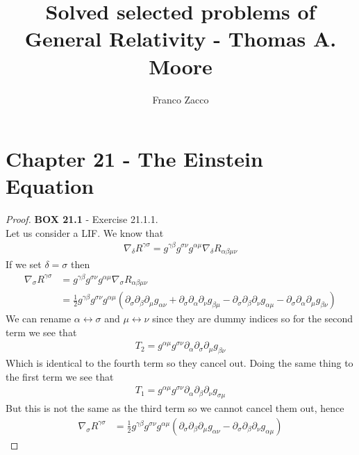 \documentclass[11pt]{article}
\title{\textbf{Solved selected problems of General Relativity - Thomas A. Moore}}
\author{Franco Zacco}
\date{}
\theoremstyle{definition}
\begin{document}
\maketitle
\thispagestyle{empty}

\section*{Chapter 21 - The Einstein Equation}

\begin{proof}{\textbf{BOX 21.1} - Exercise 21.1.1.}\\
Let us consider a LIF. We know that
\begin{align*}
    \nabla_{\delta} R^{\gamma\sigma}
    = g^{\gamma\beta} g^{\sigma\nu} g^{\alpha\mu}
    \nabla_{\delta} R_{\alpha\beta\mu\nu}
\end{align*}
If we set $\delta = \sigma$ then
\begin{align*}
    \nabla_{\sigma} R^{\gamma\sigma}
    &= g^{\gamma\beta} g^{\sigma\nu} g^{\alpha\mu}
    \nabla_{\sigma} R_{\alpha\beta\mu\nu}\\
    &= \frac{1}{2}g^{\gamma\beta} g^{\sigma\nu} g^{\alpha\mu}(
        \partial_{\sigma}\partial_\beta\partial_\mu g_{\alpha\nu}
        + \partial_{\sigma}\partial_\alpha\partial_\nu g_{\beta\mu}
        - \partial_{\sigma}\partial_\beta\partial_\nu g_{\alpha\mu}
        - \partial_{\sigma}\partial_\alpha\partial_\mu g_{\beta\nu}
    )
\end{align*}
We can rename $\alpha \leftrightarrow\sigma$ and $\mu\leftrightarrow\nu$ since
they are dummy indices so for the second term we see that
\begin{align*}
    T_2 = g^{\alpha\mu} g^{\sigma\nu}
    \partial_{\alpha}\partial_\sigma\partial_\mu g_{\beta\nu}
\end{align*}
Which is identical to the fourth term so they cancel out.
Doing the same thing to the first term we see that
\begin{align*}
    T_1 = g^{\alpha\mu} g^{\sigma\nu}
    \partial_{\alpha}\partial_\beta\partial_\nu g_{\sigma\mu}
\end{align*}
But this is not the same as the third term so we cannot cancel them out, hence
\begin{align*}
    \nabla_{\sigma} R^{\gamma\sigma}
    &= \frac{1}{2}g^{\gamma\beta} g^{\sigma\nu} g^{\alpha\mu}(
        \partial_{\sigma}\partial_\beta\partial_\mu g_{\alpha\nu}
        - \partial_{\sigma}\partial_\beta\partial_\nu g_{\alpha\mu}
    )
\end{align*}

\end{proof}
\end{document}
